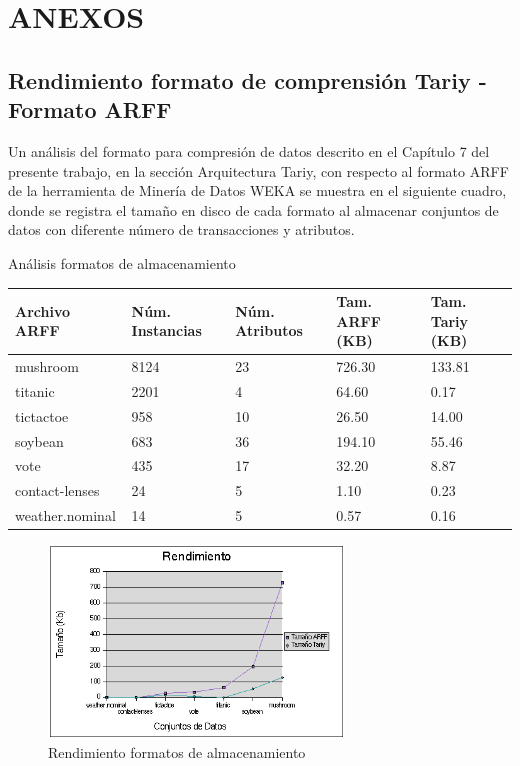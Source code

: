 \chapter{ANEXOS}
\section{Rendimiento formato de comprensi\'on Tariy - Formato ARFF}

Un an\'alisis del formato para compresi\'on de datos descrito en el Cap\'itulo 7 del presente trabajo, en la
secci\'on Arquitectura Tariy, con respecto al formato ARFF de la herramienta de Miner\'ia de Datos WEKA se
muestra en el siguiente cuadro, donde se registra el tama\~no en disco de cada formato al almacenar conjuntos de
datos con diferente n\'umero de transacciones y atributos.

\begin{table}[h]
\caption{An\'alisis formatos de almacenamiento}
\label{formatos}
\end{table}
\begin{center}
\begin{tabular}{|p{30mm}|p{20mm}|p{20mm}|p{20mm}|p{20mm}|} \hline
\textbf{Archivo ARFF}    & \textbf{N\'um. Instancias} & \textbf{N\'um. Atributos} & \textbf{Tam. ARFF (KB)} &
\textbf{Tam. Tariy (KB)}\\ \hline
mushroom        & 8124              & 23               & 726.30         & 133.81\\ \hline
titanic         & 2201              &  4               &  64.60         &   0.17\\ \hline
tictactoe       &  958              & 10               &  26.50         &  14.00\\ \hline
soybean         &  683              & 36               & 194.10         &  55.46\\ \hline
vote            &  435              & 17               &  32.20         &   8.87\\ \hline
contact-lenses  &   24              &  5               &   1.10         &   0.23\\ \hline
weather.nominal &   14              &  5               &   0.57         &   0.16\\ \hline
\end{tabular}
\end{center}

\begin{figure}[h]
\centering
\includegraphics[width=0.7\textwidth]{images/formatos.png}
\caption{Rendimiento formatos de almacenamiento}
\end{figure}
